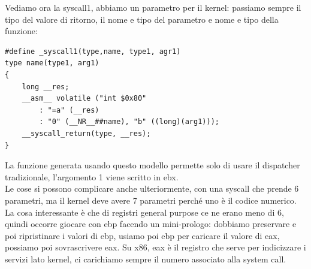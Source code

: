 \documentclass[12pt, oneside]{extbook}
\begin{document}
Vediamo ora la syscall1, abbiamo un parametro per il kernel: passiamo sempre il tipo del valore di ritorno, il nome e tipo del parametro e nome e tipo della funzione:
\begin{lstlisting}
#define _syscall1(type,name, type1, agr1)
type name(type1, arg1)
{
	long __res;
	__asm__ volatile ("int $0x80"
		: "=a" (__res)
		: "0" (__NR__##name), "b" ((long)(arg1)));
	__syscall_return(type, __res);
}
\end{lstlisting}
La funzione generata usando questo modello permette solo di usare il dispatcher tradizionale, l'argomento 1 viene scritto in ebx.\\ Le cose si possono complicare anche ulteriormente, con una syscall che prende 6 parametri, ma il kernel deve avere 7 parametri perché uno è il codice numerico.\\La cosa interessante è che di registri general purpose ce ne erano meno di 6, quindi occorre giocare con ebp facendo un mini-prologo: dobbiamo preservare e poi ripristinare i valori di ebp, usiamo poi ebp per caricare il valore di eax, possiamo poi sovrascrivere eax. Su x86, eax è il registro che serve per indicizzare i servizi lato kernel, ci carichiamo sempre il numero associato alla system call.
\end{document}
